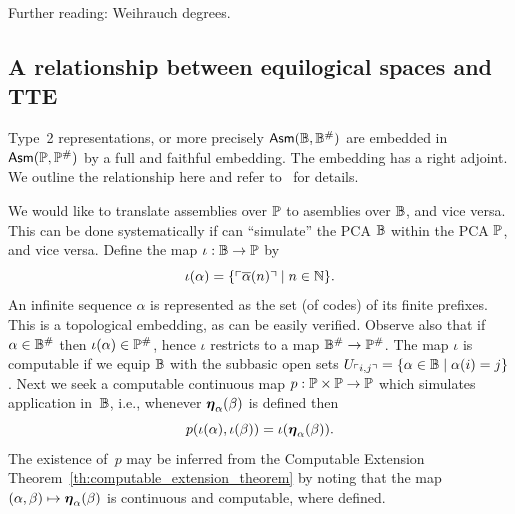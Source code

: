 Further reading: Weihrauch degrees.


\subsection{A relationship between equilogical spaces and TTE}
\label{sec:equ-tte}

Type~2 representations, or more precisely $\mathsf{Asm}(\mathbb{B},
  \mathbb{B}^{\#})$ are embedded in $\mathsf{Asm}(\mathbb{P}, \mathbb{P}^{\#})$ by a
full and faithful embedding. The embedding has a right adjoint. We
outline the relationship here and refer to~ for
details.

We would like to translate assemblies over $\mathbb{P}$ to asemblies over
$\mathbb{B}$, and vice versa. This can be done systematically if can
``simulate'' the PCA $\mathbb{B}$ within the PCA $\mathbb{P}$, and vice versa.
%
Define the map $\iota : \mathbb{B} \to \mathbb{P}$ by
\begin{equation*}
  \iota(\alpha) =
  \{ \ulcorner \overline{\alpha}(n) \urcorner \mid n \in \mathbb{N}\}.
\end{equation*}
An infinite sequence $\alpha$ is represented as the set (of codes) of
its finite prefixes. This is a topological embedding, as can be easily
verified. Observe also that if $\alpha \in \mathbb{B}^{\#}$ then
$\iota(\alpha) \in \mathbb{P}^{\#}$, hence $\iota$ restricts to a map
$\mathbb{B}^{\#} \to \mathbb{P}^{\#}$.
%
The map $\iota$ is computable if we equip $\mathbb{B}$ with the subbasic
open sets $U_{\ulcorner i,j \urcorner} = \{\alpha \in \mathbb{B} \mid \alpha(i) =
  j\}$. Next we seek a computable continuous map $p : \mathbb{P} \times
\mathbb{P} \to \mathbb{P}$ which simulates application in~$\mathbb{B}$, i.e.,
whenever $\text{\boldmath{$\eta$}}_{\alpha}(\beta)$ is defined then
%
\begin{equation*}
  p (\iota(\alpha), \iota(\beta)) = \iota(\text{\boldmath{$\eta$}}_{\alpha}(\beta)).
\end{equation*}
%
The existence of~$p$ may be inferred from the Computable Extension
Theorem~\ref{th:computable_extension_theorem} by noting that the map
$(\alpha, \beta) \mapsto \text{\boldmath{$\eta$}}_{\alpha}(\beta)$ is continuous and
computable, where defined.


